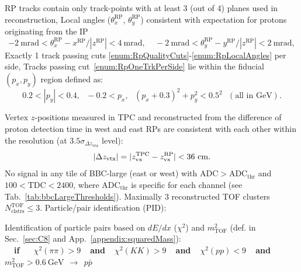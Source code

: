 \begin{enumerate}[label=\textbf{\hyperref[sec:C\arabic*]{C\arabic*}},ref=C\arabic*]
      \begin{enumerate}[label=\textbf{\theenumi.\arabic*},ref=\theenumi.\arabic*]
      \itemm RP tracks contain only track-points with at least 3 (out of 4) planes used in reconstruction,\label{enum:RpQualityCuts}
      \itemm Local angles ($\theta_{x}^{\text{RP}}$, $\theta_{y}^{\text{RP}}$) consistent with expectation for protons originating from the IP\label{enum:RpLocalAngles}%
      \[-2~\text{mrad}<\theta_{x}^{\text{RP}}-x^{\text{RP}}/|z^{\text{RP}}|<4~\text{mrad},~~~~~-2~\text{mrad}<\theta_{y}^{\text{RP}}-y^{\text{RP}}/|z^{\text{RP}}|<2~\text{mrad},\]
      \itemm Exactly 1 track passing cuts \ref{enum:RpQualityCuts}-\ref{enum:RpLocalAngles} per side,\label{enum:RpOneTrkPerSide}
      \itemm Tracks passing cut~\ref{enum:RpOneTrkPerSide} lie within the fiducial $(p_{x},p_{y})$ region defined as\vspace*{-7pt}\label{enum:RpFiducial}:\\
      \[0.2<|p_{y}|<0.4,~~~-0.2<p_{x},~~~(p_{x}+0.3)^{2}+p_{y}^{2}<0.5^{2}~~~(\text{all in GeV}).\]
    \end{enumerate}
 \itemm Vertex $z$-positions measured in TPC and reconstructed from the difference of proton detection time in west and east RPs are consistent with each other within the resolution (at $3.5\sigma_{\Delta z_{\text{vtx}}}$ level):
 \[|\Delta z_{\text{vtx}}| = |z_{\text{vx}}^{\text{TPC}}-z_{\text{vx}}^{\text{RP}}|<36~\text{cm}.\vspace{-17pt}\]\label{enum:CutDeltaZVx}
 \itemm No signal in any tile of BBC-large (east or west) with $\text{ADC}>\text{ADC}_{\text{thr}}$ and $100<\text{TDC}<2400$, where $\text{ADC}_{\text{thr}}$ is specific for each channel (see Tab.~\ref{tab:bbcLargeThresholds}).\label{enum:CutBbcLarge}%
 \itemm Maximally 3 reconstructed TOF clusters $N^{\text{TOF}}_{\text{clstrs}}\leq 3$.\label{enum:CutTofClusters}%
 \itemm Particle/pair identification (PID):\label{enum:CutPid}
 \begin{enumerate}[label=\textbf{\theenumi.\arabic*},ref=\theenumi.\arabic*]
      \itemm Identification of particle pairs based on $dE/dx$ ($\chi^{2}$) and $m^{2}_{\text{TOF}}$ (def. in Sec.~\ref{sec:C8} and App.~\ref{appendix:squaredMass}):\label{enum:CutPidNoPtLimit}\\[3pt]
        \textbf{~~if~~~}\hspace*{4.5pt}$\chi^{2}(\pi\pi)>9$\textbf{~~and~~}$\chi^{2}(KK)>9$\textbf{~~and~~}$\chi^{2}(pp)<9$\textbf{~~and~~}$m^{2}_{\text{TOF}}>0.6~\text{GeV}~~\rightarrow~~p\bar{p}$\\[5pt]%

\end{enumerate}
\end{enumerate}
